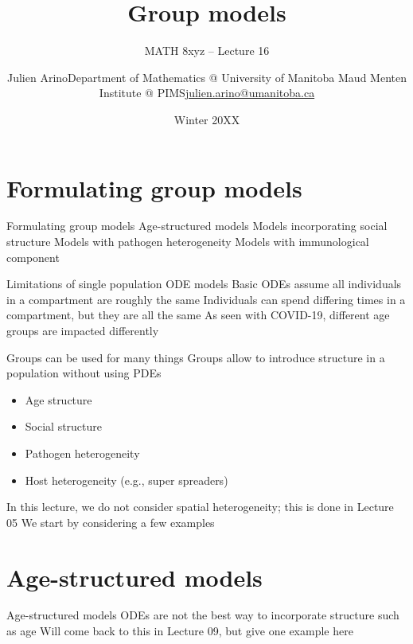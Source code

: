 \documentclass[aspectratio=169]{beamer}\usepackage[]{graphicx}\usepackage[]{xcolor}
\subtitle{MATH 8xyz -- Lecture 16}
\author{\texorpdfstring{Julien Arino\newline Department of Mathematics @ University of Manitoba \newline Maud Menten Institute @ PIMS\newline\url{julien.arino@umanitoba.ca}}{Julien Arino}}
\date{Winter 20XX}
\title{Group models}
\begin{document}

\section{Formulating group models}
\begin{frame}{Formulating group models}
\bbullet Age-structured models
\bbullet Models incorporating social structure
\bbullet Models with pathogen heterogeneity
\bbullet Models with immunological component
\end{frame}

\begin{frame}{Limitations of single population ODE models}
\bbullet Basic ODEs assume all individuals in a compartment are roughly the same
\bbullet Individuals can spend differing times in a compartment, but they are all the same
\bbullet As seen with COVID-19, different age groups are impacted differently
\end{frame}

\begin{frame}{Groups can be used for many things}
\bbullet Groups allow to introduce structure in a population without using PDEs
\begin{itemize}
  \item Age structure
  \item Social structure
  \item Pathogen heterogeneity
  \item Host heterogeneity (e.g., super spreaders)
\end{itemize}
\vfill
\bbullet In this lecture, we do not consider spatial heterogeneity; this is done in Lecture 05
\bbullet We start by considering a few examples
\end{frame}

\section{Age-structured models}
\begin{frame}{Age-structured models}
\bbullet ODEs are not the best way to incorporate structure such as age
\bbullet Will come back to this in Lecture 09, but give one example here
\end{frame}
\end{document}
